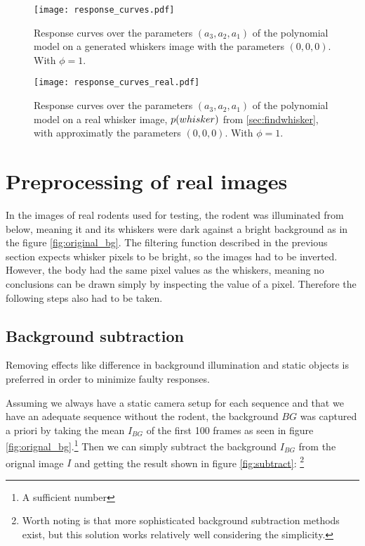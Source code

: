 \begin{figure}
    \centering
    \texttt{[image: response\_curves.pdf]}
    \caption{
        Response curves over the parameters $(a_3,a_2,a_1)$ of the polynomial model on a generated whiskers image with the parameters $(0,0,0)$. With $\phi=1$.
    }
    \label{fig:response_generated}
\end{figure}
\begin{figure}
    \centering
    \texttt{[image: response\_curves\_real.pdf]}
    \caption{
        Response curves over the parameters $(a_3,a_2,a_1)$ of the polynomial model on a real whisker image, $p{(whisker)}$ from \ref{sec:findwhisker},
        with approximatly the parameters $(0,0,0)$. With $\phi=1$.
    }
    \label{fig:response_real}
\end{figure}

\section{Preprocessing of real images}
\label{prep-real}

In the images of real rodents used for testing, the rodent was
illuminated from below, meaning it and its whiskers were dark against
a bright background as in the figure \ref{fig:original_bg}. The filtering function described in the previous
section expects whisker pixels to be bright, so the images had to be
inverted. However, the body had the same pixel values as the whiskers,
meaning no conclusions can be drawn simply by inspecting the value of
a pixel. Therefore the following steps also had to be taken.

\subsection{Background subtraction}
Removing effects like difference in background illumination and static
objects is preferred in order to minimize faulty responses.

Assuming we always have a static camera setup for each sequence and
that we have an adequate sequence without the rodent, the background
$BG$ was captured a priori by taking the mean $I_{BG}$ of the first
100 frames as seen in figure \ref{fig:orignal_bg}.\footnote{A sufficient number} Then we can simply subtract
the background $I_{BG}$ from the orignal image $I$ and getting the result shown in figure \ref{fig:subtract}: \footnote{Worth
noting is that more sophisticated background subtraction methods
exist, but this solution works relatively well considering the
simplicity.}

